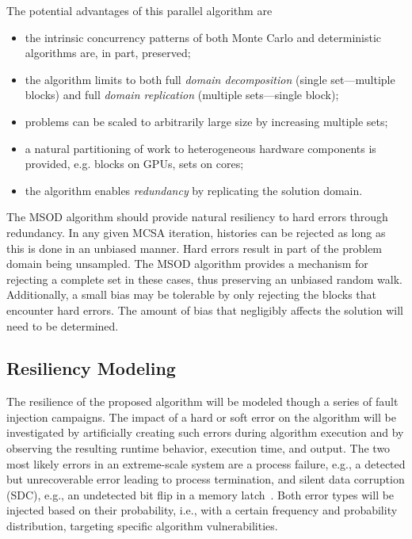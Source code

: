 The potential advantages of this parallel algorithm are
\begin{itemize}
  \parskip = -2pt
\item the intrinsic concurrency patterns of both Monte Carlo and deterministic
  algorithms are, in part, preserved;
\item the algorithm limits to both full \textit{domain decomposition} (single
  set---multiple blocks) and full \textit{domain replication} (multiple
  sets---single block);
\item problems can be scaled to arbitrarily large size by increasing multiple
  sets;
\item a natural partitioning of work to heterogeneous hardware components is
  provided, e.g. blocks on GPUs, sets on cores;
\item the algorithm enables \textit{redundancy} by replicating the solution
  domain.
\end{itemize}
The MSOD algorithm should provide natural resiliency to hard errors through
redundancy.  In any given MCSA iteration, histories can be rejected as long as
this is done in an unbiased manner.  Hard errors result in part of the problem
domain being unsampled.  The MSOD algorithm provides a mechanism for rejecting
a complete set in these cases, thus preserving an unbiased random walk.
Additionally, a small bias may be tolerable by only rejecting the blocks that
encounter hard errors.  The amount of bias that negligibly affects the
solution will need to be determined.


\subsection{Resiliency Modeling}
\label{sec:resiliency}

The resilience of the proposed algorithm will be modeled though a series of
fault injection campaigns. The impact of a hard or soft error on the algorithm
will be investigated by artificially creating such errors during algorithm
execution and by observing the resulting runtime behavior, execution time, and
output. The two most likely errors in an extreme-scale system are a process
failure, e.g., a detected but unrecoverable error leading to process
termination, and silent data corruption (SDC), e.g., an undetected bit flip in
a memory latch~\cite{cappello09toward, elnozahy08system, geist09major,
  kogge08exascale, schroeder07understanding,
  Schroeder:2009:DEW:1555349.1555372, Hwang:2012:CRD:2189750.2150989,
  10.1109/TC.2011.106}. Both error types will be injected based on their
probability, i.e., with a certain frequency and probability distribution,
targeting specific algorithm vulnerabilities.


